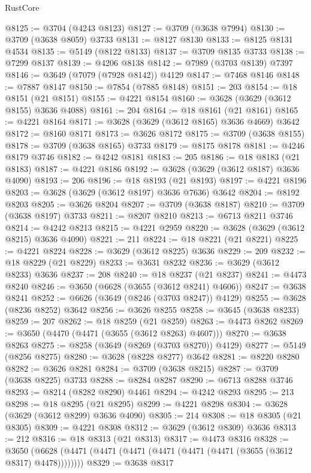 \begin{lexlean}{RustCore}
\begin{coremodule}
@8125 := @3704 (@4243 @8123)
@8127 := @3709 (@3638 @7994)
@8130 := @3709 (@3638 @8059) @3733
@8131 := @8127 @8130
@8133 := @8125 @8131 @4534
@8135 := @5149 (@8122 @8133)
@8137 := @3709 @8135 @3733
@8138 := @7299 @8137
@8139 := @4206 @8138
@8142 := @7989 (@3703 @8139) @7397
@8146 := @3649 (@7079 (@7928 @8142)) @4129
@8147 := @7468 @8146
@8148 := @7887 @8147
@8150 := @7854 (@7885 @8148)
@8151 := 203
@8154 := @18 @8151 (@21 @8151)
@8155 := @4221 @8154
@8160 := @3628 (@3629 (@3612 @8155) @3636 @4088)
@8161 := 204
@8164 := @18 @8161 (@21 @8161)
@8165 := @4221 @8164
@8171 := @3628 (@3629 (@3612 @8165) @3636 @4669) @3642
@8172 := @8160 @8171
@8173 := @3626 @8172
@8175 := @3709 (@3638 @8155)
@8178 := @3709 (@3638 @8165) @3733
@8179 := @8175 @8178
@8181 := @4246 @8179 @3746
@8182 := @4242 @8181
@8183 := 205
@8186 := @18 @8183 (@21 @8183)
@8187 := @4221 @8186
@8192 := @3628 (@3629 (@3612 @8187) @3636 @4090)
@8193 := 206
@8196 := @18 @8193 (@21 @8193)
@8197 := @4221 @8196
@8203 := @3628 (@3629 (@3612 @8197) @3636 @7636) @3642
@8204 := @8192 @8203
@8205 := @3626 @8204
@8207 := @3709 (@3638 @8187)
@8210 := @3709 (@3638 @8197) @3733
@8211 := @8207 @8210
@8213 := @6713 @8211 @3746
@8214 := @4242 @8213
@8215 := @4221 @2959
@8220 := @3628 (@3629 (@3612 @8215) @3636 @4090)
@8221 := 211
@8224 := @18 @8221 (@21 @8221)
@8225 := @4221 @8224
@8228 := @3629 (@3612 @8225) @3636
@8229 := 209
@8232 := @18 @8229 (@21 @8229)
@8233 := @3631 @8232
@8236 := @3629 (@3612 @8233) @3636
@8237 := 208
@8240 := @18 @8237 (@21 @8237)
@8241 := @4473 @8240
@8246 := @3650 (@6628 (@3655 (@3612 @8241) @4606))
@8247 := @3638 @8241
@8252 := @6626 (@3649 (@8246 (@3703 @8247)) @4129)
@8255 := @3628 (@8236 @8252) @3642
@8256 := @3626 @8255
@8258 := @3645 (@3638 @8233)
@8259 := 207
@8262 := @18 @8259 (@21 @8259)
@8263 := @4473 @8262
@8269 := @3650 (@4470 (@4471 (@3655 (@3612 @8263) @4607)))
@8270 := @3638 @8263
@8275 := @8258 (@3649 (@8269 (@3703 @8270)) @4129)
@8277 := @5149 (@8256 @8275)
@8280 := @3628 (@8228 @8277) @3642
@8281 := @8220 @8280
@8282 := @3626 @8281
@8284 := @3709 (@3638 @8215)
@8287 := @3709 (@3638 @8225) @3733
@8288 := @8284 @8287
@8290 := @6713 @8288 @3746
@8293 := @8214 (@8282 @8290) @4461
@8294 := @4242 @8293
@8295 := 213
@8298 := @18 @8295 (@21 @8295)
@8299 := @4221 @8298
@8304 := @3628 (@3629 (@3612 @8299) @3636 @4090)
@8305 := 214
@8308 := @18 @8305 (@21 @8305)
@8309 := @4221 @8308
@8312 := @3629 (@3612 @8309) @3636
@8313 := 212
@8316 := @18 @8313 (@21 @8313)
@8317 := @4473 @8316
@8328 := @3650 (@6628 (@4471 (@4471 (@4471 (@4471 (@4471 (@4471 (@3655 (@3612 @8317) @4478))))))))
@8329 := @3638 @8317

\end{coremodule}
\end{lexlean}

